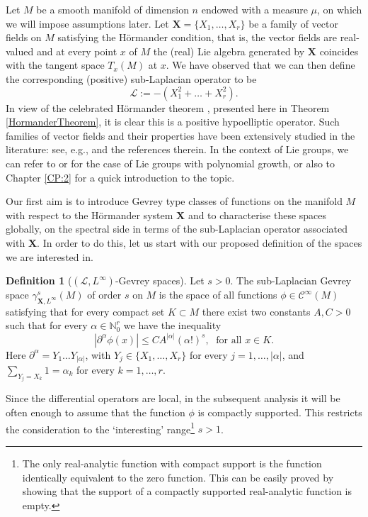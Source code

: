 \documentclass[12pt,oneside,a4paper]{book}
\numberwithin{equation}{section}     %
\theoremstyle{plain}
\theoremstyle{definition}
\newtheorem{definition}[theorem]{Definition}
\newcommand{\N}{{\mathbb N}}
\newcommand{\slp}{{\mathcal L}}
\begin{document}
Let $M$ be a smooth manifold of dimension $n$ endowed with a  measure $\mu$, on which we will impose assumptions later. Let $\mathbf{X} =\{X_1,\dots,X_r\}$ be a family of vector fields on $M$ satisfying the H\"{o}rmander condition, that is, the vector fields are real-valued and at every point $x$ of $M$ the (real) Lie algebra generated by $\mathbf {X}$ coincides with the tangent space $T_x(M)$ at $x$. We have observed that we can then define the corresponding (positive) sub-Laplacian operator to be
\[
\slp:=-(X_1^2+\dots+X_r^2).
\]
In view of the celebrated H\"ormander theorem \cite{H1967}, presented here in Theorem \ref{HormanderTheorem}, it is clear this is a positive hypoelliptic operator. Such families of vector fields and their properties have been extensively studied in the literature: see, e.g., \cite{B2014} and the references therein. In the context of Lie groups, we can refer to \cite{VSC1992} or \cite{tER2012} for the case of Lie groups with polynomial growth, or also to Chapter \ref{CP:2} for a quick introduction to the topic. 

Our first aim is to introduce Gevrey type classes of functions on 
the manifold $M$ with respect to the H\"ormander system $\mathbf X$ and to characterise these spaces globally, on the spectral side in terms of the sub-Laplacian operator associated with $\mathbf X$. In order to do this, let us start with our proposed definition of the spaces we are interested in.

\begin{definition}[$(\slp,L^\infty)$-Gevrey spaces]\label{DEF:gsl}
	Let $s>0$. The sub-Laplacian Gevrey space $\gamma^s_{\mathbf{X},L^\infty}(M)$ of order $s$ on $M$ is the space of all functions $\phi\in\mathcal{C}^\infty(M)$ satisfying that for every compact set $K\subset M$ there exist two constants $A,C>0$ such that for every $\alpha\in\N^r_0$  we have the inequality 
	\begin{equation}\label{gevrey}
	|\partial^\alpha \phi(x)|\leq C A^{|\alpha|}(\alpha!)^s,\;\textrm{ for all } x\in K.
	\end{equation}
	Here $\partial^\alpha=Y_1\dots Y_{|\alpha|}$, with $Y_j\in\{X_1,\dots,X_r\}$ for every $j=1,\dots,|\alpha|$, and $\sum_{Y_j=X_k}1=\alpha_k$ for every $k=1,\dots,r$.
\end{definition}
Since the differential operators are local, in the subsequent analysis it will be often enough to assume that the function $\phi$ is compactly supported. This restricts the consideration to the `interesting' range\footnote{The only real-analytic function with compact support is the function identically equivalent  to the zero function. This can be easily proved by showing that the support of a compactly supported real-analytic function is empty.} $s>1$. 
\end{document}
